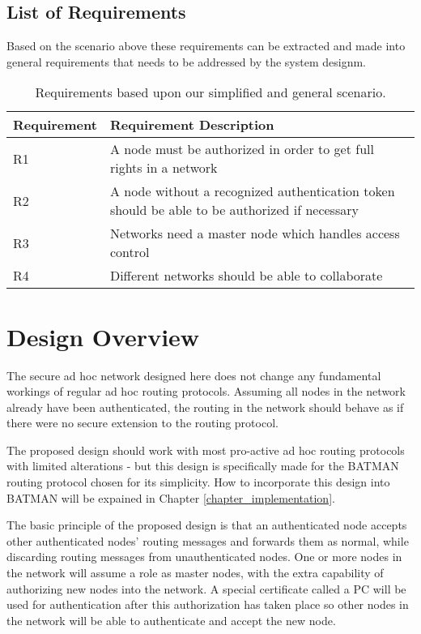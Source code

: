 \subsection{List of Requirements}
Based on the scenario above these requirements can be extracted and made into
general requirements that needs to be addressed by the system designm.

\begin{table}[ht!]
	\centering
	\begin{tabular}{ | l | p{11cm} | }
	\hline
	\textbf{Requirement} & \textbf{Requirement Description}\\\hline
		R1 & A node must be authorized in order to get full rights in a
		network\\\hline
		R2 & A node without a recognized authentication token should be able to be
		authorized if necessary\\ \hline
		R3 & Networks need a master node which handles access control\\\hline
		R4 & Different networks should be able to collaborate\\\hline
	\end{tabular}
	\caption{Requirements based upon our simplified and general scenario.}
	\label{tab:our_req}
\end{table}



\section{Design Overview}
The secure ad hoc network designed here does not change any fundamental workings
of regular ad hoc routing protocols. Assuming all nodes in the network already
have been authenticated, the routing in the network should behave as if there
were no secure extension to the routing protocol.

The proposed design should work with most pro-active ad hoc routing protocols
with limited alterations - but this design is specifically made for the BATMAN routing
protocol chosen for its simplicity. How to incorporate this design into BATMAN
will be expained in Chapter \ref{chapter_implementation}.

The basic principle of the proposed design is that an authenticated node accepts
other authenticated nodes' routing messages and forwards them as normal, while
discarding routing messages from unauthenticated nodes. One or more nodes in the
network will assume a role as master nodes, with the extra capability of
authorizing new nodes into the network. A special certificate called a \ac{PC}
will be used for authentication after this authorization has taken place so
other nodes in the network will be able to authenticate and accept the new
node.

